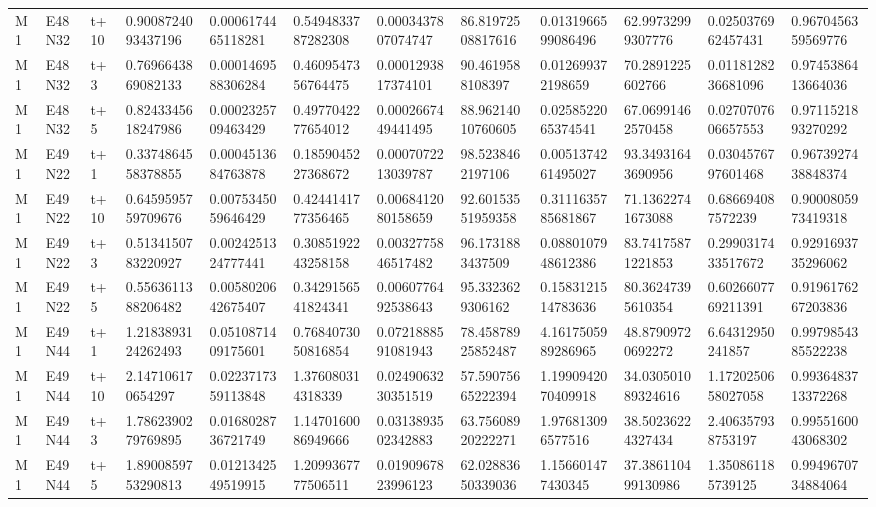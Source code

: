\begin{landscape}
\begin{longtable}{llllllllllll}
M1 & E48N32 & t+10 & 0.9008724093437196 & 0.0006174465118281 & 0.5494833787282308 & 0.0003437807074747 & 86.81972508817616 & 0.0131966599086496 & 62.99732999307776 & 0.0250376962457431 & 0.9670456359569776 \\
M1 & E48N32 & t+3 & 0.7696643869082133 & 0.0001469588306284 & 0.4609547356764475 & 0.0001293817374101 & 90.4619588108397 & 0.012699372198659 & 70.2891225602766 & 0.0118128236681096 & 0.9745386413664036 \\
M1 & E48N32 & t+5 & 0.8243345618247986 & 0.0002325709463429 & 0.4977042277654012 & 0.0002667449441495 & 88.96214010760605 & 0.0258522065374541 & 67.06991462570458 & 0.0270707606657553 & 0.9711521893270292 \\
M1 & E49N22 & t+1 & 0.3374864558378855 & 0.0004513684763878 & 0.1859045227368672 & 0.0007072213039787 & 98.5238462197106 & 0.0051374261495027 & 93.34931643690956 & 0.0304576797601468 & 0.9673927438848374 \\
M1 & E49N22 & t+10 & 0.6459595759709676 & 0.0075345059646429 & 0.4244141777356465 & 0.0068412080158659 & 92.60153551959358 & 0.3111635785681867 & 71.13622741673088 & 0.686694087572239 & 0.9000805973419318 \\
M1 & E49N22 & t+3 & 0.5134150783220927 & 0.0024251324777441 & 0.3085192243258158 & 0.0032775846517482 & 96.1731883437509 & 0.0880107948612386 & 83.74175871221853 & 0.2990317433517672 & 0.9291693735296062 \\
M1 & E49N22 & t+5 & 0.5563611388206482 & 0.0058020642675407 & 0.3429156541824341 & 0.0060776492538643 & 95.3323629306162 & 0.1583121514783636 & 80.36247395610354 & 0.6026607769211391 & 0.9196176267203836 \\
M1 & E49N44 & t+1 & 1.2183893124262493 & 0.0510871409175601 & 0.7684073050816854 & 0.0721888591081943 & 78.45878925852487 & 4.1617505989286965 & 48.87909720692272 & 6.64312950241857 & 0.9979854385522238 \\
M1 & E49N44 & t+10 & 2.147106170654297 & 0.0223717359113848 & 1.376080314318339 & 0.0249063230351519 & 57.59075665222394 & 1.1990942070409918 & 34.030501089324616 & 1.1720250658027058 & 0.9936483713372268 \\
M1 & E49N44 & t+3 & 1.7862390279769895 & 0.0168028736721749 & 1.1470160086949666 & 0.0313893502342883 & 63.75608920222271 & 1.976813096577516 & 38.50236224327434 & 2.406357938753197 & 0.9955160043068302 \\
M1 & E49N44 & t+5 & 1.8900859753290813 & 0.0121342549519915 & 1.2099367777506511 & 0.0190967823996123 & 62.02883650339036 & 1.156601477430345 & 37.386110499130986 & 1.350861185739125 & 0.9949670734884064 \\

\end{longtable}
\end{landscape}
